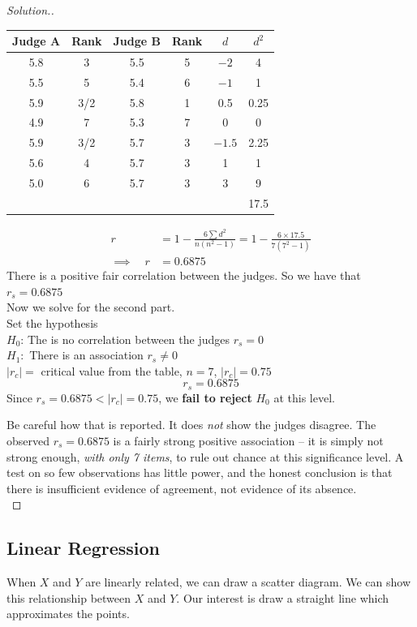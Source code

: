 \documentclass[11pt,a4paper]{article}
\theoremstyle{definition}
\newenvironment{solution}
  {\renewcommand{\qedsymbol}{}\begin{proof}[\textit{Solution}.]}
  {\end{proof}}
\begin{document}
\begin{solution}
\begin{table}[H]
\begin{tabular}{cccccc}
Judge A& Rank &Judge B& Rank &$d$& $d^2$\\
\hline 5.8&3&5.5&5&$-2$&4\\
5.5&5&5.4&6&$-1$&1\\ 5.9&3/2&5.8&1&0.5&0.25\\ 4.9&7&5.3&7&0&0\\ 5.9&3/2&5.7&3&$-1.5$&2.25\\ 5.6&4&5.7&3&1&1\\ 5.0&6&5.7&3&3&9\\
\hline &&&&&17.5
\end{tabular}
\end{table}

\begin{align*}
r&=1-\frac{6\sum d^2}{n(n^2-1)}=1-\frac{6\times 17.5}{7(7^2-1)}\\[1ex] \implies\quad  r&=0.6875
\end{align*}
There is a positive fair correlation between the judges. So we have that $r_s=0.6875$\\

Now we solve for the second part.\\
Set the hypothesis\\
$H_0$: The  is no correlation between the judges $r_s=0$\\ $H_1:$ There is an association $r_s\neq 0$\\[1ex] $|r_c|=$ critical value from the table, $n=7$, $|r_c|=0.75$\\ \[r_s=0.6875\] Since $r_s = 0.6875 < |r_c| = 0.75$, we \textbf{fail to reject} $H_0$ at this level.

Be careful how that is reported. It does \emph{not} show the judges disagree. The observed
$r_s = 0.6875$ is a fairly strong positive association -- it is simply not strong enough,
\emph{with only 7 items}, to rule out chance at this significance level. A test on so few
observations has little power, and the honest conclusion is that there is insufficient
evidence of agreement, not evidence of its absence.\\[1ex]
\end{solution}





\subsection{Linear Regression}
When $X$ and $Y$ are linearly related, we can draw a scatter diagram. We can show this relationship between $X$ and $Y$. Our interest is draw a straight line which approximates the points.
\end{document}
